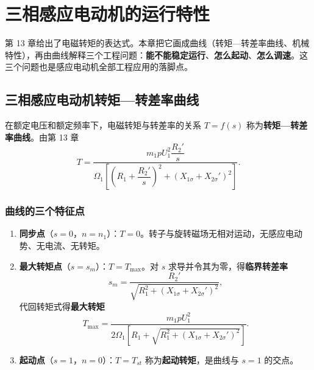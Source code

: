 \chapter{三相感应电动机的运行特性}

第 13 章给出了电磁转矩的表达式。本章把它画成曲线（转矩—转差率曲线、机械特性），再由曲线解释三个工程问题：\textbf{能不能稳定运行}、\textbf{怎么起动}、\textbf{怎么调速}。这三个问题也是感应电动机全部工程应用的落脚点。

\section{三相感应电动机转矩—转差率曲线}

在额定电压和额定频率下，电磁转矩与转差率的关系 $T=f(s)$ 称为\textbf{转矩—转差率曲线}。由第 13 章
\begin{equation}
T=\frac{m_1pU_1^{2}\dfrac{R_2'}{s}}{\Omega_1\left[\left(R_1+\dfrac{R_2'}{s}\right)^{2}+\left(X_{1\sigma}+X_{2\sigma}'\right)^{2}\right]} .
\end{equation}

\subsection{曲线的三个特征点}
\begin{enumerate}
  \item \textbf{同步点}（$s=0$，$n=n_1$）：$T=0$。转子与旋转磁场无相对运动，无感应电动势、无电流、无转矩。
  \item \textbf{最大转矩点}（$s=s_m$）：$T=T_{\max}$。对 $s$ 求导并令其为零，得\textbf{临界转差率}
  \begin{equation}
  s_m=\frac{R_2'}{\sqrt{R_1^{2}+\left(X_{1\sigma}+X_{2\sigma}'\right)^{2}}} ,
  \end{equation}
  代回转矩式得\textbf{最大转矩}
  \begin{equation}
  T_{\max}=\frac{m_1pU_1^{2}}{2\Omega_1\left[R_1+\sqrt{R_1^{2}+\left(X_{1\sigma}+X_{2\sigma}'\right)^{2}}\right]} .
  \end{equation}
  \item \textbf{起动点}（$s=1$，$n=0$）：$T=T_{st}$ 称为\textbf{起动转矩}，是曲线与 $s=1$ 的交点。
\end{enumerate}

